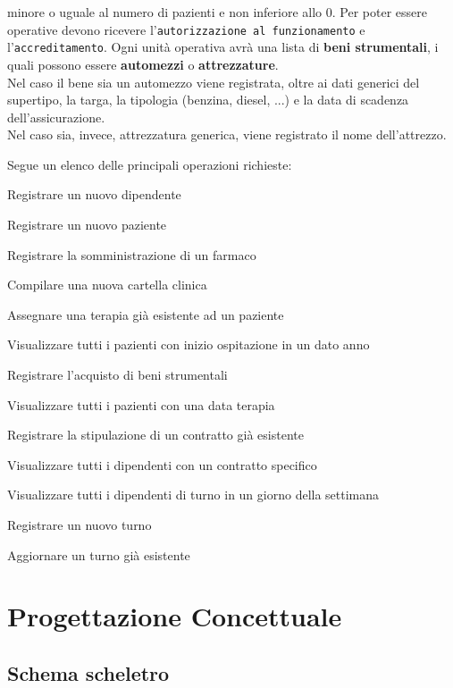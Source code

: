 \documentclass[a4paper, 12pt]{report}
\newenvironment{changemargin}[2]{%
  \begin{list}{}{%
    \setlength{\topsep}{0pt}%
    \setlength{\leftmargin}{#1}%
    \setlength{\rightmargin}{#2}%
    \setlength{\listparindent}{\parindent}%
    \setlength{\itemindent}{\parindent}%
    \setlength{\parsep}{\parskip}%
  }%
  \item[]}{\end{list}}
\newenvironment{packed_enum}{
\begin{enumerate}
        \setlength{\itemsep}{1pt}
        \setlength{\parskip}{0pt}
        \setlength{\parsep}{0pt}
}{\end{enumerate}}
\begin{document}
\begin{changemargin}{0.5cm}{0.5cm}
        minore o uguale al numero di pazienti e non inferiore allo 0.
        Per poter essere operative devono ricevere l'\texttt{autorizzazione al funzionamento} e l'\texttt{accreditamento}.
        Ogni unità operativa avrà una lista di \textbf{beni strumentali}, i quali possono essere \textbf{automezzi} o \textbf{attrezzature}. \\
        Nel caso il bene sia un automezzo viene registrata, oltre ai dati generici del supertipo, la targa, la tipologia (benzina, diesel, ...)
        e la data di scadenza dell'assicurazione. \\
        Nel caso sia, invece, attrezzatura generica, viene registrato il nome dell'attrezzo.
        \newline
\end{changemargin}
Segue un elenco delle principali operazioni richieste:
\begin{packed_enum}
        \item Registrare un nuovo dipendente
        \item Registrare un nuovo paziente
        \item Registrare la somministrazione di un farmaco 
        \item Compilare una nuova cartella clinica 
        \item Assegnare una terapia già esistente ad un paziente
        \item Visualizzare tutti i pazienti con inizio ospitazione in un dato anno
        \item Registrare l'acquisto di beni strumentali
        \item Visualizzare tutti i pazienti con una data terapia
        \item Registrare la stipulazione di un contratto già esistente 
        \item Visualizzare tutti i dipendenti con un contratto specifico
        \item Visualizzare tutti i dipendenti di turno in un giorno della settimana
        \item Registrare un nuovo turno 
        \item Aggiornare un turno già esistente 
\end{packed_enum}

\chapter{Progettazione Concettuale}

\section{Schema scheletro}
\end{document}
